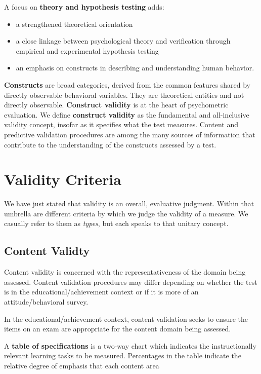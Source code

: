 \documentclass[
  english,
]{book}
\providecommand{\tightlist}{%
  \setlength{\itemsep}{0pt}\setlength{\parskip}{0pt}}
\begin{document}
A focus on \textbf{theory and hypothesis testing} adds:

\begin{itemize}
\tightlist
\item
  a strengthened theoretical orientation
\item
  a close linkage between psychological theory and verification through empirical and experimental hypothesis testing
\item
  an emphasis on constructs in describing and understanding human behavior.
\end{itemize}

\textbf{Constructs} are broad categories, derived from the common features shared by directly observable behavioral variables. They are theoretical entities and not directly observable. \textbf{Construct validity} is at the heart of psychometric evaluation. We define \textbf{construct validity} as the fundamental and all-inclusive validity concept, insofar as it specifies what the test measures. Content and predictive validation procedures are among the many sources of information that contribute to the understanding of the constructs assessed by a test.

\hypertarget{validity-criteria}{%
\section{Validity Criteria}\label{validity-criteria}}

We have just stated that validity is an overall, evaluative judgment. Within that umbrella are different criteria by which we judge the validity of a measure. We casually refer to them as \emph{types}, but each speaks to that unitary concept.

\hypertarget{content-validty}{%
\subsection{Content Validty}\label{content-validty}}

Content validity is concerned with the representativeness of the domain being assessed. Content validation procedures may differ depending on whether the test is in the educational/achievement context or if it is more of an attitude/behavioral survey.

In the educational/achievement context, content validation seeks to ensure the items on an exam are appropriate for the content domain being assessed.

A \textbf{table of specifications} is a two-way chart which indicates the instructionally relevant learning tasks to be measured. Percentages in the table indicate the relative degree of emphasis that each content area
\end{document}
